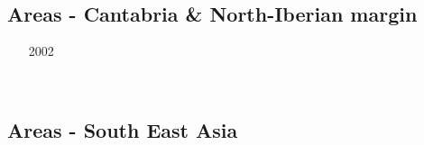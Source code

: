 \begin{scriptsize}
\begin{itemize}
\item[\twothousandthirteen]
\textcite{necb13} \\
\item[\twothousandtwenty]
\textcite{vaga20} \\
\item[\twothousandtwentyone]
\textcite{vasv21} 
\end{itemize}
\end{scriptsize}

\subsection{Areas - Cantabria \& North-Iberian margin}

\begin{scriptsize}
\begin{itemize}
\item[2002]
\textcite{clbb02} \\
\item[\twothousandfifteen]
\textcite{peap15} \\
\end{itemize}
\end{scriptsize}

\subsection{Areas - South East Asia}

\begin{scriptsize}
\begin{itemize}
\item[\twothousand]
\textcite{lecd00} \\
\item[\twothousandfour]
\textcite{rekv04} \\
\item[\twothousandfifteen]
\textcite{yotr15} \\
\textcite{hasp15} \\
\textcite{meds15} \\
\item[\twothousandsixteen]
\textcite{necg16} \\
\end{itemize}
\end{scriptsize}


